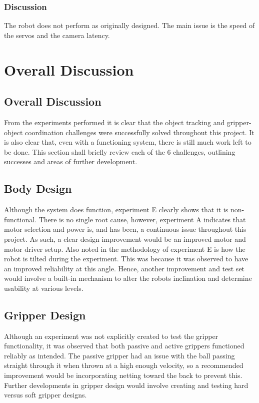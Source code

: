 \documentclass[conference]{IEEEtran}
\begin{document}
\subsubsection{Discussion}
The robot does not perform as originally designed. The main issue is the speed of the servos and the camera latency.


\section{Overall Discussion}\label{overall}
\subsection{Overall Discussion}
From the experiments performed it is clear that the object tracking and gripper-object coordination challenges were successfully solved throughout this project. It is also clear that, even with a functioning system, there is still much work left to be done. This section shall briefly review each of the 6 challenges, outlining successes and areas of further development.

\subsection{Body Design}
Although the system does function, experiment E clearly shows that it is non-functional. There is no single root cause, however, experiment A indicates that motor selection and power is, and has been, a continuous issue throughout this project. As such, a clear design improvement would be an improved motor and motor driver setup.
Also noted in the methodology of experiment E is how the robot is tilted during the experiment. This was because it was observed to have an improved reliability at this angle. Hence, another improvement and test set would involve a built-in mechanism to alter the robots inclination and determine usability at various levels.

\subsection{Gripper Design}
Although an experiment was not explicitly created to test the gripper functionality, it was observed that both passive and active grippers functioned reliably as intended. The passive gripper had an issue with the ball passing straight through it when thrown at a high enough velocity, so a recommended improvement would be incorporating netting toward the back to prevent this.
Further developments in gripper design would involve creating and testing hard versus soft gripper designs.
\end{document}

